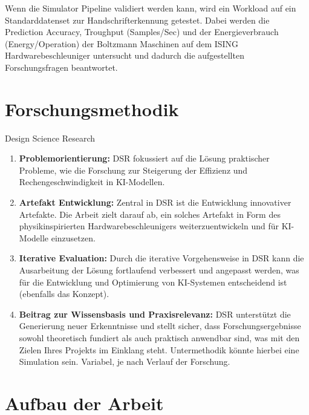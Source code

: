 Wenn die Simulator Pipeline validiert werden kann, wird ein Workload auf ein
Standarddatenset zur Handschrifterkennung getestet. Dabei werden die Prediction
Accuracy, Troughput (Samples/Sec) und der Energieverbrauch (Energy/Operation)
der Boltzmann Maschinen auf dem ISING Hardwarebeschleuniger untersucht und
dadurch die aufgestellten Forschungsfragen beantwortet.

\section{Forschungsmethodik}

Design Science Research

\begin{enumerate}
    \item \textbf{Problemorientierung:} DSR fokussiert auf die Lösung praktischer Probleme, wie die Forschung zur Steigerung der Effizienz und Rechengeschwindigkeit in KI-Modellen.
    \item \textbf{Artefakt Entwicklung:} Zentral in DSR ist die Entwicklung innovativer Artefakte. Die Arbeit zielt darauf ab, ein solches Artefakt in Form des physikinspirierten Hardwarebeschleunigers weiterzuentwickeln und für KI-Modelle einzusetzen.
    \item \textbf{Iterative Evaluation:} Durch die iterative Vorgehensweise in DSR kann die Ausarbeitung der Lösung fortlaufend verbessert und angepasst werden, was für die Entwicklung und Optimierung von KI-Systemen entscheidend ist (ebenfalls das Konzept).
    \item \textbf{Beitrag zur Wissensbasis und Praxisrelevanz:} DSR unterstützt die Generierung neuer Erkenntnisse und stellt sicher, dass Forschungsergebnisse sowohl theoretisch fundiert als auch praktisch anwendbar sind, was mit den Zielen Ihres Projekts im Einklang steht. Untermethodik könnte hierbei eine Simulation sein. Variabel, je nach Verlauf der Forschung.
\end{enumerate}


\section{Aufbau der Arbeit}